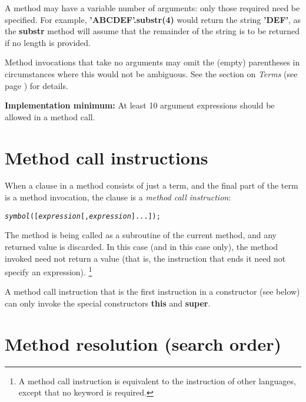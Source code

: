 A method may have a variable number of arguments: only those
required need be specified.
For example, \textbf{'ABCDEF'.substr(4)} would return the
string \textbf{'DEF'}, as the \textbf{substr} method will assume
that the remainder of the string is to be returned if no length is
provided.
 
Method invocations that take no arguments may omit the (empty)
parentheses in circumstances where this would not be ambiguous.
See the section on  \emph{Terms} (see page \pageref{refterms})  for details.
 
\textbf{Implementation minimum:} At least 10 argument expressions
should be allowed in a method call.
\section{Method call instructions}\label{refmcalli}
 
When a clause in a method consists of just a term, and the final part of
the term is a method invocation, the clause is a \emph{method call
instruction}:
\begin{shaded}
\begin{alltt}
\emph{symbol}([\emph{expression}[,\emph{expression}]...]);
\end{alltt}
\end{shaded}
The method is being called as a subroutine of the current method, and
any returned value is discarded.
In this case (and in this case only), the method invoked need not return
a value (that is, the  instruction that ends it need not
specify an expression).
\footnote{
A method call instruction is equivalent to the  instruction
of other languages, except that no keyword is required.
}
 
A method call instruction that is the first instruction in a constructor
(see below) can only invoke the special constructors \textbf{this}
and \textbf{super}.
\section{Method resolution (search order)}\label{refsmeth}
 
